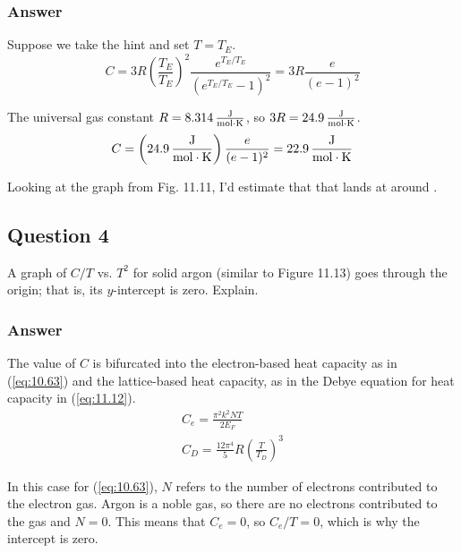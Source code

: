 \documentclass[12pt]{article}
\newcommand{\e}[1]{e^{#1}}
\begin{document}
        \subsubsection{Answer}
            Suppose we take the hint and set $T = T_E$.
            \begin{equation}
                C   =   3R \left( \frac{T_E}{T_E} \right)^2 \frac{\e{T_E / T_E}}{\left( \e{T_E / T_E} - 1 \right)^2}
                    =   3R\frac{e}{(e-1)^2}
            \end{equation}

            The universal gas constant $R = 8.314\,\unit{\frac{\joule}{\mole\cdot\kelvin}}$, so $3R = 24.9\,\unit{\frac{\joule}{\mole\cdot\kelvin}}$.
            \begin{equation}
                C   =   \left( 24.9\,\unit{\frac{\joule}{\mole\cdot\kelvin}} \right) \frac{e}{(e-1)^2}
                    =   22.9\,\unit{\frac{\joule}{\mole\cdot\kelvin}}
            \end{equation}

            Looking at the graph from Fig. 11.11, I'd estimate that that lands at around .

    \subsection{Question 4}
        A graph of $C/T$ vs. $T^2$ for solid argon (similar to Figure 11.13) goes through the origin; that is, its $y$-intercept is zero. 
        Explain.

        \subsubsection{Answer}
            The value of $C$ is bifurcated into the electron-based heat capacity as in (\ref{eq:10.63}) and the lattice-based heat capacity, as in the Debye equation for heat capacity in (\ref{eq:11.12}). 
            \begin{gather}
                \label{eq:10.63} \tag{10.63}
                C_e = \frac{\pi^2 k^2 N T}{2 E_F}\\
                \label{eq:11.12} \tag{11.12}
                C_D = \frac{12\pi^4}{5}R\left( \frac{T}{T_D} \right)^3
            \end{gather}

            In this case for (\ref{eq:10.63}), $N$ refers to the number of electrons contributed to the electron gas.
            Argon is a noble gas, so there are no electrons contributed to the gas and $N = 0$.
            This means that $C_e = 0$, so $C_e / T = 0$, which is why the intercept is zero.
\end{document}
